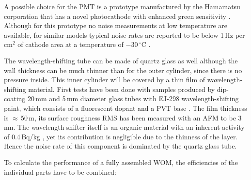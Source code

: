 A possible choice for the PMT is a prototype manufactured by the Hamamatsu 
corporation that has a novel photocathode with enhanced green sensitivity 
\cite{hamamatsu}. Although for this prototype no noise measurements at low 
temperature are available, for similar models typical noise rates are reported 
to be below 1\,Hz per cm$^2$ of cathode area at a temperature of 
$-30\,^\circ\mathrm{C}$
\cite{meyerPMT}.

The wavelength-shifting tube can be made of quartz glass as well although the 
wall thickness can be much thinner than for the outer cylinder, since there is 
no pressure inside. This inner cylinder will be covered by a thin film of 
wavelength-shifting material.
First tests have been done with samples produced by dip-coating 20\,mm and 5\,mm 
diameter glass tubes with EJ-298 wavelength-shifting paint, which consists of a 
fluorescent dopant and a PVT base \cite{paintprops}. The film thickness is 
$\approx$\,50\,\textmu m, its surface roughness RMS has been measured with an 
AFM to be 3\,nm. The wavelength shifter itself is an organic material with an 
inherent activity of 0.4\,Bq/kg \cite{pvtnoise}, yet its contribution is 
negligible due to the thinness of the layer. Hence the noise rate of this 
component is dominated by the quartz glass tube. 

To calculate the performance of a fully assembled WOM, the efficiencies of the  
individual parts have to be combined:


